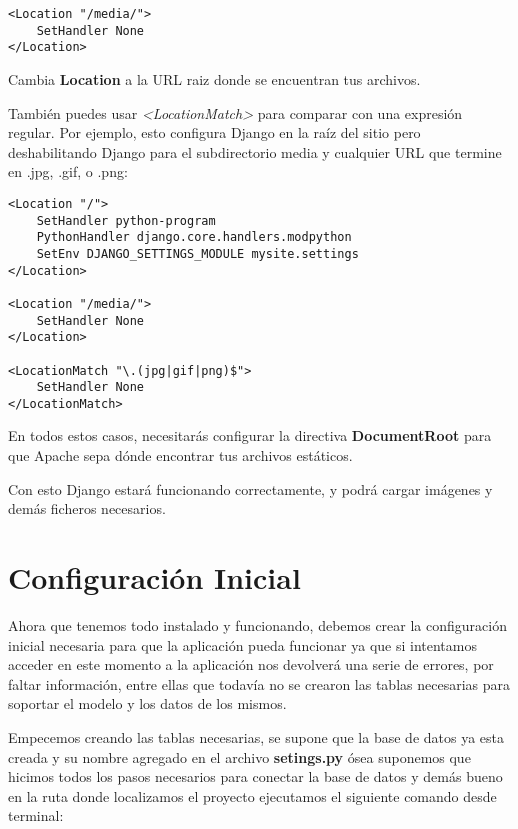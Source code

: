 \begin{lstlisting}[style=consola]
<Location "/media/">
    SetHandler None
</Location>
\end{lstlisting}
\vspace{0.1cm}

Cambia \textbf{Location} a la URL raiz donde se encuentran tus archivos.

También puedes usar \textit{<LocationMatch>} para comparar con una expresión regular. Por ejemplo, esto configura Django en la raíz del sitio pero deshabilitando Django para el subdirectorio media y cualquier URL que termine en .jpg, .gif, o .png:

\begin{lstlisting}[style=consola]
<Location "/">
    SetHandler python-program
    PythonHandler django.core.handlers.modpython
    SetEnv DJANGO_SETTINGS_MODULE mysite.settings
</Location>

<Location "/media/">
    SetHandler None
</Location>

<LocationMatch "\.(jpg|gif|png)$">
    SetHandler None
</LocationMatch>
\end{lstlisting}
\vspace{0.1cm}

En todos estos casos, necesitarás configurar la directiva \textbf{DocumentRoot} para que Apache sepa dónde encontrar tus archivos estáticos.

Con esto Django estará funcionando correctamente, y podrá cargar imágenes y demás ficheros necesarios.


\section{Configuración Inicial}

Ahora que tenemos todo instalado y funcionando, debemos crear la configuración inicial necesaria para que la aplicación pueda funcionar ya que si intentamos acceder en este momento a la aplicación nos devolverá una serie de errores, por faltar información, entre ellas que todavía no se crearon las tablas necesarias para soportar el modelo y los datos de los mismos.

Empecemos creando las tablas necesarias, se supone que la base de datos ya esta creada y su nombre agregado en el archivo \textbf{setings.py} ósea suponemos que hicimos todos los pasos necesarios para conectar la base de datos y demás bueno en la ruta donde localizamos el proyecto ejecutamos el siguiente comando desde terminal:

